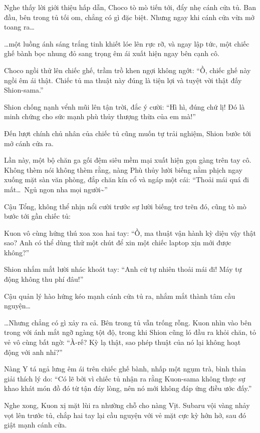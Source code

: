 \documentclass[../main.tex]{subfiles}
\begin{document}
Nghe thấy lời giới thiệu hấp dẫn, Choco tò mò tiến tới, đẩy nhẹ cánh cửa tủ. Ban đầu, bên trong tủ tối om, chẳng có gì đặc biệt. Nhưng ngay khi cánh cửa vừa mở toang ra\dots


\dots một luồng ánh sáng trắng tinh khiết lóe lên rực rỡ, và ngay lập tức, một chiếc ghế bành bọc nhung đỏ sang trọng êm ái xuất hiện ngay bên cạnh cô.

Choco ngồi thử lên chiếc ghế, trầm trồ khen ngợi không ngớt:
``Ồ, chiếc ghế này ngồi êm ái thật. Chiếc tủ ma thuật này đúng là tiện lợi và tuyệt vời thật đấy Shion-sama.''

Shion chống nạnh vểnh mũi lên tận trời, đắc ý cười:
``Hì hì, đúng chứ lị! Đó là minh chứng cho sức mạnh phù thủy thượng thừa của em mà!''

Đến lượt chính chủ nhân của chiếc tủ cũng muốn tự trải nghiệm, Shion bước tới mở cánh cửa ra.


Lần này, một bộ chăn ga gối đệm siêu mềm mại xuất hiện gọn gàng trên tay cô. Không thèm nói không thèm rằng, nàng Phù thủy lười biếng nằm phịch ngay xuống mặt sàn văn phòng, đắp chăn kín cổ và ngáp một cái:
``Thoải mái quá đi mất\dots\ Ngủ ngon nha mọi người\~{}''

Cậu Tổng, không thể nhịn nổi cười trước sự lười biếng trơ trẽn đó, cũng tò mò bước tới gần chiếc tủ:

Kuon vô cùng hứng thú xoa xoa hai tay:
``Ồ, ma thuật vận hành kỳ diệu vậy thật sao? Anh có thể dùng thử một chút để xin một chiếc laptop xịn mới được không?''

Shion nhắm mắt lười nhác khoát tay:
``Anh cứ tự nhiên thoải mái đi! Máy tự động không thu phí đâu!''

Cậu quản lý hào hứng kéo mạnh cánh cửa tủ ra, nhắm mắt thành tâm cầu nguyện\dots

\dots Nhưng chẳng có gì xảy ra cả. Bên trong tủ vẫn trống rỗng. Kuon nhìn vào bên trong với ánh mắt ngỡ ngàng tột độ, trong khi Shion cũng ló đầu ra khỏi chăn, tỏ vẻ vô cùng bất ngờ: ``À-rế? Kỳ lạ thật, sao phép thuật của nó lại không hoạt động với anh nhỉ?''

Nàng Y tá ngả lưng êm ái trên chiếc ghế bành, nhấp một ngụm trà, bình thản giải thích lý do:
``Có lẽ bởi vì chiếc tủ nhận ra rằng Kuon-sama không thực sự khao khát món đồ đó từ tận đáy lòng, nên nó mới không đáp ứng điều ước đấy.''

Nghe xong, Kuon xị mặt lùi ra nhường chỗ cho nàng Vịt. Subaru vội vàng nhảy vọt lên trước tủ, chắp hai tay lại cầu nguyện với vẻ mặt cực kỳ hớn hở, sau đó giật mạnh cánh cửa.
\end{document}
